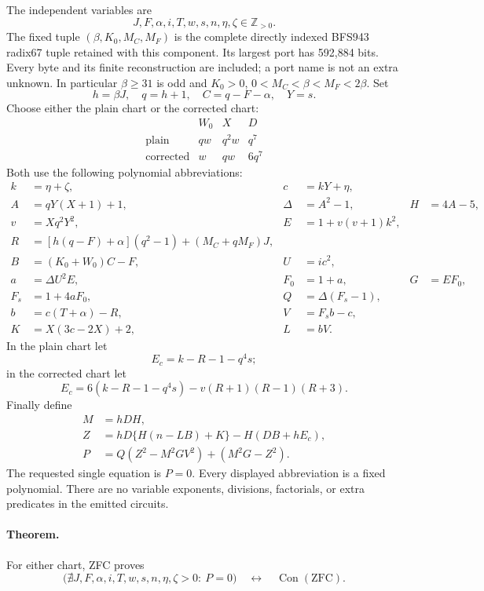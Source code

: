 The independent variables are
\[
 J,F,\alpha,i,T,w,s,n,\eta,\zeta\in\mathbb Z_{>0}.
\]
The fixed tuple \((\beta,K_0,M_C,M_F)\) is the complete directly
indexed BFS943 radix67 tuple retained with this component. Its largest
port has 592,884 bits. Every byte and its finite reconstruction are
included; a port name is not an extra unknown. In particular
\(\beta\ge31\) is odd and
\(K_0>0\), \(0<M_C<\beta<M_F<2\beta\).
Set
\[
 h=\beta J,\quad q=h+1,\quad C=q-F-\alpha,\quad Y=s.
\]
Choose either the plain chart or the corrected chart:
\[
\begin{array}{c|ccc}
 &W_0&X&D\\ \hline
 \text{plain}&qw&q^2w&q^7\\
 \text{corrected}&w&qw&6q^7
\end{array}
\]
Both use the following polynomial abbreviations:
\begin{align*}
 k&=\eta+\zeta,&c&=kY+\eta,\\
 A&=qY(X+1)+1,&\Delta&=A^2-1,&H&=4A-5,\\
 v&=Xq^2Y^2,&E&=1+v(v+1)k^2,\\
 R&=[h(q-F)+\alpha](q^2-1)+(M_C+qM_F)J,\\
 B&=(K_0+W_0)C-F,&U&=ic^2,\\
 a&=\Delta U^2E,&F_0&=1+a,&G&=EF_0,\\
 F_s&=1+4aF_0,&Q&=\Delta(F_s-1),\\
 b&=c(T+\alpha)-R,&V&=F_sb-c,\\
 K&=X(3c-2X)+2,&L&=bV.
\end{align*}
In the plain chart let
\[
 E_c=k-R-1-q^4s;
\]
in the corrected chart let
\[
 E_c=6(k-R-1-q^4s)-v(R+1)(R-1)(R+3).
\]
Finally define
\begin{align*}
 M&=hDH,\\
 Z&=hD\{H(n-LB)+K\}-H(DB+hE_c),\\
 P&=Q(Z^2-M^2GV^2)+(M^2G-Z^2).
\end{align*}
The requested single equation is \(P=0\). Every displayed abbreviation
is a fixed polynomial. There are no variable exponents, divisions,
factorials, or extra predicates in the emitted circuits.

\paragraph{Theorem.}
For either chart, ZFC proves
\[
 \bigl(\nexists J,F,\alpha,i,T,w,s,n,\eta,\zeta>0:\ P=0\bigr)
 \quad\longleftrightarrow\quad\operatorname{Con}(\mathrm{ZFC}).
\]

